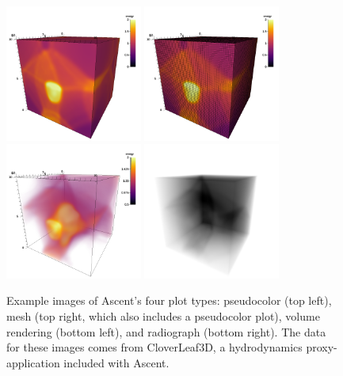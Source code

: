 \begin{figure}
\centering
  \includegraphics[width=0.4\textwidth]{images/pseudocolor250}
  \includegraphics[width=0.4\textwidth]{images/mesh250}
  \includegraphics[width=0.4\textwidth]{images/volume250}
  \includegraphics[width=0.4\textwidth]{images/radiograph250}
  \caption{\label{fig:ascent_plots} Example images of Ascent's four plot types:
pseudocolor (top left), mesh (top right, which also includes a pseudocolor plot),
volume rendering (bottom left), and radiograph (bottom right).
%
The data for these images comes from CloverLeaf3D,
a hydrodynamics proxy-application included with Ascent.
  }
\end{figure}

